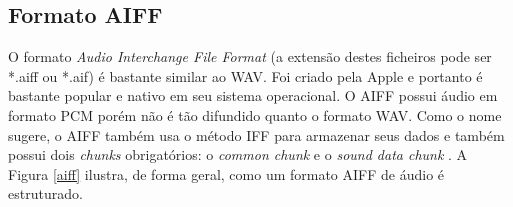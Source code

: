 \subsection{Formato AIFF}

O formato \textit{Audio Interchange File Format} (a extensão destes ficheiros pode ser *.aiff ou *.aif) é bastante similar ao WAV. Foi criado pela Apple e portanto é bastante popular e nativo em seu sistema operacional. O AIFF possui áudio em formato PCM porém não é tão difundido quanto o formato WAV. Como o nome sugere, o AIFF também usa o método IFF para armazenar seus dados e também possui dois \textit{chunks} obrigatórios: o \textit{common chunk} e o \textit{sound data chunk} \cite{muratnkonar}. A Figura \ref{aiff} ilustra, de forma geral, como um formato AIFF de áudio é estruturado.

 \begin{figure}[ht]
	\centering

\end{figure}
